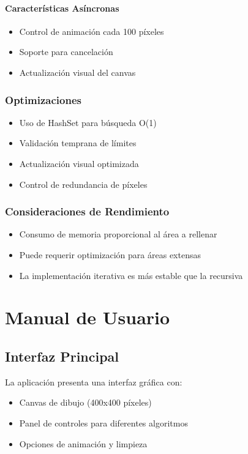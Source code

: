 \documentclass[12pt]{article}
\begin{document}
\paragraph{Características Asíncronas}
\begin{itemize}
    \item Control de animación cada 100 píxeles
    \item Soporte para cancelación
    \item Actualización visual del canvas
\end{itemize}

\subsubsection{Optimizaciones}
\begin{itemize}
    \item Uso de HashSet para búsqueda O(1)
    \item Validación temprana de límites
    \item Actualización visual optimizada
    \item Control de redundancia de píxeles
\end{itemize}

\subsubsection{Consideraciones de Rendimiento}
\begin{itemize}
    \item Consumo de memoria proporcional al área a rellenar
    \item Puede requerir optimización para áreas extensas
    \item La implementación iterativa es más estable que la recursiva
\end{itemize}

\section{Manual de Usuario}

\subsection{Interfaz Principal}
La aplicación presenta una interfaz gráfica con:
\begin{itemize}
    \item Canvas de dibujo (400x400 píxeles)
    \item Panel de controles para diferentes algoritmos
    \item Opciones de animación y limpieza
\end{itemize}
\end{document}
